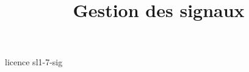 \documentclass [xcolor=table] {beamer}
\title {Gestion des signaux}
\begin{document}
 {licence}
 {sl1-7-sig}
\end{document}
